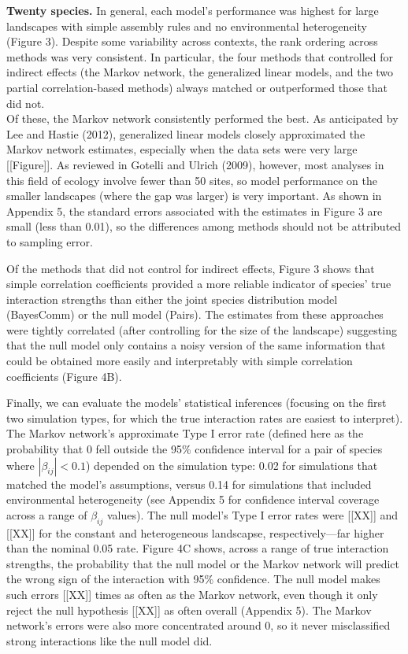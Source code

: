 \documentclass[12pt,]{article}
\begin{document}
\begin{spacing}{1.9}
\begin{flushleft}
\noindent
\textbf{Twenty species.} In general, each model's performance was
highest for large landscapes with simple assembly rules and no
environmental heterogeneity (Figure 3). Despite some variability across
contexts, the rank ordering across methods was very consistent. In
particular, the four methods that controlled for indirect effects (the
Markov network, the generalized linear models, and the two partial
correlation-based methods) always matched or outperformed those that did
not.\\
Of these, the Markov network consistently performed the best. As
anticipated by Lee and Hastie (2012), generalized linear models closely
approximated the Markov network estimates, especially when the data sets
were very large {[}{[}Figure{]}{]}. As reviewed in Gotelli and Ulrich
(2009), however, most analyses in this field of ecology involve fewer
than 50 sites, so model performance on the smaller landscapes (where the
gap was larger) is very important. As shown in Appendix 5, the standard
errors associated with the estimates in Figure 3 are small (less than
0.01), so the differences among methods should not be attributed to
sampling error.

Of the methods that did not control for indirect effects, Figure 3 shows
that simple correlation coefficients provided a more reliable indicator
of species' true interaction strengths than either the joint species
distribution model (BayesComm) or the null model (Pairs). The estimates
from these approaches were tightly correlated (after controlling for the
size of the landscape) suggesting that the null model only contains a
noisy version of the same information that could be obtained more easily
and interpretably with simple correlation coefficients (Figure 4B).

Finally, we can evaluate the models' statistical inferences (focusing on
the first two simulation types, for which the true interaction rates are
easiest to interpret). The Markov network's approximate Type I error
rate (defined here as the probability that 0 fell outside the 95\%
confidence interval for a pair of species where \(|\beta_{ij}|<0.1\))
depended on the simulation type: 0.02 for simulations that matched the
model's assumptions, versus 0.14 for simulations that included
environmental heterogeneity (see Appendix 5 for confidence interval
coverage across a range of \(\beta_{ij}\) values). The null model's Type
I error rates were {[}{[}XX{]}{]} and {[}{[}XX{]}{]} for the constant
and heterogeneous landscapse, respectively---far higher than the nominal
0.05 rate. Figure 4C shows, across a range of true interaction
strengths, the probability that the null model or the Markov network
will predict the wrong sign of the interaction with 95\% confidence. The
null model makes such errors {[}{[}XX{]}{]} times as often as the Markov
network, even though it only reject the null hypothesis {[}{[}XX{]}{]}
as often overall (Appendix 5). The Markov network's errors were also
more concentrated around 0, so it never misclassified strong
interactions like the null model did.


\end{flushleft}
\end{spacing}
\end{document}
